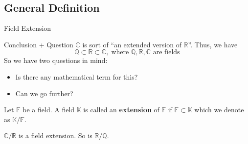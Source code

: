 \documentclass{beamer}
\begin{document}
    \subsection{General Definition}
    \begin{frame}{Field Extension}
        \begin{block}{Conclusion + Question}
            $\mathbb{C}$ is sort of ``an extended version of $\mathbb{R}$''. Thus, we have
            \begin{equation*}
                \mathbb{Q} \subset \mathbb{R} \subset \mathbb{C}, \; \text{where $\mathbb{Q},\mathbb{R},\mathbb{C}$ are fields}
            \end{equation*}
            So we have two questions in mind: 
            \begin{itemize}
                \item Is there any mathematical term for this?
                \item Can we go further?\pause
            \end{itemize}
        \end{block}

        \begin{definition}
            Let $\mathbb{F}$ be a field. A field $\mathbb{K}$ is called an \textbf{extension} of $\mathbb{F}$ if $\mathbb{F} \subset \mathbb{K}$ which we denote as $\mathbb{K}/\mathbb{F}$.\pause
        \end{definition}

        \begin{example}
            $\mathbb{C}/\mathbb{R}$ is a field extension. So is $\mathbb{R}/\mathbb{Q}$.
        \end{example}
    \end{frame}
\end{document}
